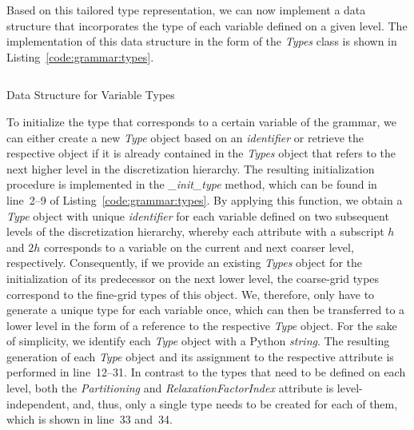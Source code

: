 Based on this tailored type representation, we can now implement a data structure that incorporates the type of each variable defined on a given level.
The implementation of this data structure in the form of the \emph{Types} class is shown in Listing~\ref{code:grammar:types}.
\begin{listing}
  	\inputminted[linenos]{python}{evostencils/grammar/types.py}
  	\caption{Data Structure for Variable Types}
  	\label{code:grammar:types}
\end{listing}
To initialize the type that corresponds to a certain variable of the grammar, we can either create a new \emph{Type} object based on an \emph{identifier} or retrieve the respective object if it is already contained in the \emph{Types} object that refers to the next higher level in the discretization hierarchy.
The resulting initialization procedure is implemented in the \emph{\_init\_type} method, which can be found in line~2--9 of Listing~\ref{code:grammar:types}.
By applying this function, we obtain a \emph{Type} object with unique \emph{identifier} for each variable defined on two subsequent levels of the discretization hierarchy, whereby each attribute with a subscript $h$ and $2h$ corresponds to a variable on the current and next coarser level, respectively.
Consequently, if we provide an existing \emph{Types} object for the initialization of its predecessor on the next lower level, the coarse-grid types correspond to the fine-grid types of this object.
We, therefore, only have to generate a unique type for each variable once, which can then be transferred to a lower level in the form of a reference to the respective \emph{Type} object.
For the sake of simplicity, we identify each \emph{Type} object with a Python \emph{string}. 
The resulting generation of each \emph{Type} object and its assignment to the respective attribute is performed in line~12--31.
In contrast to the types that need to be defined on each level, both the \emph{Partitioning} and \emph{RelaxationFactorIndex} attribute is level-independent, and, thus, only a single type needs to be created for each of them, which is shown in line~33 and~34.


